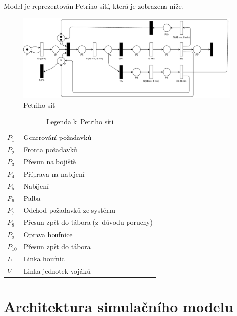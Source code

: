\documentclass[a4paper]{article}
\begin{document}
            Model je reprezentován Petriho sítí, která je zobrazena níže.

            \begin{figure}[H]
                \includegraphics[scale=0.61, keepaspectratio]{fig/petri.pdf}
                \caption{Petriho síť}
                \label{fig:petri_nest}
            \end{figure}

            \begin{table}[H]
                \centering
                \begin{tabular}{ l l }
                    $P_1$ & Generování požadavků \\
                    $P_2$ & Fronta požadavků \\
                    $P_3$ & Přesun na bojiště \\
                    $P_4$ & Příprava na nabíjení \\
                    $P_5$ & Nabíjení \\
                    $P_6$ & Palba \\
                    $P_7$ & Odchod požadavků ze systému \\
                    $P_8$ & Přesun zpět do tábora (z~důvodu poruchy) \\
                    $P_9$ & Oprava houfnice \\
                    $P_{10}$ & Přesun zpět do tábora \\
                    $L$ & Linka houfnic \\
                    $V$ & Linka jednotek vojáků
                \end{tabular}
                \caption{Legenda k~Petriho síti}
                \label{tab:petri}
            \end{table}

    \section{Architektura simulačního modelu}
    \label{sec:architecture}
\end{document}
